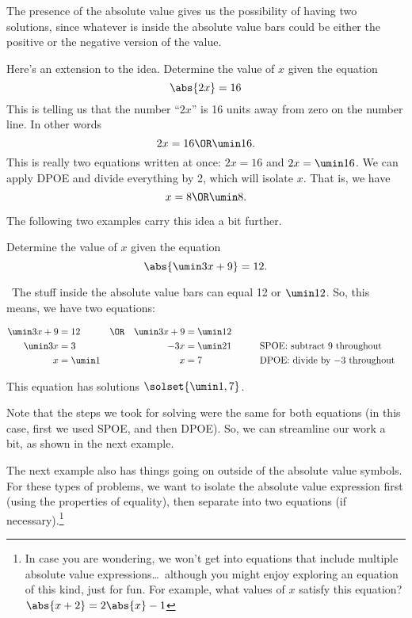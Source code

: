 The presence of the absolute value gives us the possibility of having two solutions, since whatever is inside the absolute value bars could be either the positive or the negative version of the value.

Here's an extension to the idea. Determine the value of $x$ given the equation \[\abs{2x} = 16\]
This is telling us that the number ``$2x$'' is 16 units away from zero on the number line. In other words \[2x = 16 \OR \umin16.\]
This is really two equations written at once: $2x = 16$ and $2x = \umin16$. We can apply DPOE and divide everything by 2, which will isolate $x$. That is, we have \[x = 8 \OR \umin8.\]

The following two examples carry this idea a bit further.

\begin{boxex}
Determine the value of $x$ given the equation \[\abs{\umin3x+9} = 12.\]

\exsoln\ The stuff inside the absolute value bars can equal 12 or $\umin12$. So, this means, we have two equations:

\[\begin{aligned}
\umin3x + 9 &= 12 	&\OR 	&&\umin3x + 9 &= \umin12\\
\umin3x  &= 3 		&	 	&&-3x &= \umin21
&&\text{\qquad SPOE: subtract 9 throughout}\\
x &= \umin1 		&	 	&&x &= 7
&&\text{\qquad DPOE: divide by $-3$ throughout}\\
\end{aligned}\]

This equation has solutions $\solset{\umin1, 7}$.
\end{boxex}

Note that the steps we took for solving were the same for both equations (in this case, first we used SPOE, and then DPOE). So, we can streamline our work a bit, as shown in the next example.

The next example also has things going on outside of the absolute value symbols. For these types of problems, we want to isolate the absolute value expression first (using the properties of equality), then separate into two equations (if necessary).\footnote{In case you are wondering, we won't get into equations that include multiple absolute value expressions\ldots\ although you might enjoy exploring an equation of this kind, just for fun. For example, what values of $x$ satisfy this equation? $\abs{x+2}=2\abs{x}-1$}

